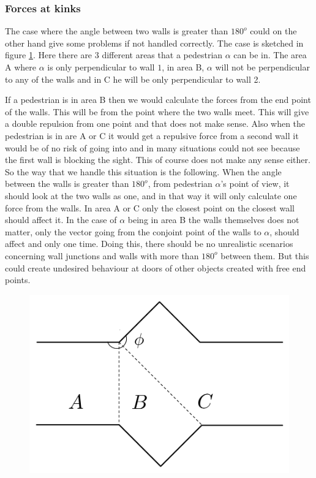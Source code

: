 \subsubsection{Forces at kinks}
The case where the angle between two walls is greater than $180^o$ could on the 
other hand give some problems if not handled correctly. The case is sketched in 
figure \ref{fig:wallcase}. Here there are 3 different areas that a pedestrian $\alpha$ 
can be in. The area A where $\alpha$ is only perpendicular to wall $1$, in area B, 
$\alpha$ will not be perpendicular to any of the walls and in C he will be only 
perpendicular to wall 2. 

If a pedestrian is in area B then we would calculate the 
forces from the end point of the walls. This will be from the point where the two 
walls meet. This will give a double repulsion from one point and that 
does not make sense. Also when the pedestrian is in are A or C it would get a repulsive force 
from a second wall it would be of no risk of going into and in many situations 
could not see because the first wall is blocking the sight. This of course does not 
make any sense either. So the way that we handle this situation is the following. 
When the angle between the walls is greater than $180^o$, from pedestrian $\alpha$'s 
point of view, it should look at the two walls as one, and in that way it will 
only calculate one force from the walls. In area A or C only the closest point 
on the closest wall should affect it. In the case of $\alpha$ being in area B 
the walls themselves does not matter, only the vector going from the conjoint 
point of the walls to $\alpha$, should affect and only one time. Doing this, 
there should be no unrealistic scenarios concerning wall junctions and walls 
with more than $180^o$ between them. But this could create undesired 
behaviour at doors of other objects created with free end points.

\begin{figure}[ht]
\centering
\includegraphics[scale=0.45]{Figures/WallCase.pdf} 
\caption{}\label{fig:wallcase}
\end{figure}

